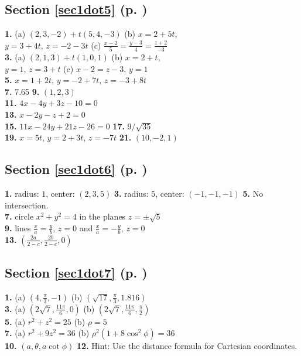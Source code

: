 \begin{multicols}{2}
\subsection*{Section \ref{sec1dot5} (p. \pageref{sec1dot5})}
\textbf{1.} (a) $(2,3,-2) + t(5,4,-3)$ \quad (b) $x = 2 + 5t,$\\$y = 3 + 4t, \, z = -2 - 3t$ \quad (c) $\frac{x - 2}{5} =
\frac{y - 3}{4} = \frac{z + 2}{-3}$\\\textbf{3.} (a) $(2,1,3) + t(1,0,1)$ \quad (b) $x = 2 + t,$\\$y = 1, \, z = 3 + t$
\quad (c) $x - 2 = z - 3, \, y = 1$\\\textbf{5.} $x = 1 + 2t, \, y = -2 + 7t, \, z = -3 + 8t$\\\textbf{7.} 7.65 \quad
\textbf{9.} $(1,2,3)$\\\textbf{11.} $4x - 4y + 3z - 10 = 0$\\\textbf{13.} $x - 2y - z + 2 = 0$\\\textbf{15.}
$11x - 24y + 21z - 26 = 0$ \quad \textbf{17.} $9/\sqrt{35}$\\\textbf{19.} $x = 5t$, $y = 2 + 3t$, $z = -7t$
\quad \textbf{21.} $(10,-2,1)$
\subsection*{Section \ref{sec1dot6} (p. \pageref{sec1dot6})}
\textbf{1.} radius: $1$, center: $(2,3,5)$ \quad \textbf{3.} radius: $5$, center: $(-1,-1,-1)$ \quad \textbf{5.} No
intersection.\\\textbf{7.} circle $x^2 + y^2 = 4$ in the planes $z = \pm \sqrt{5}$\\\textbf{9.} lines
$\frac{x}{a} = \frac{y}{b}$, $z = 0$ and $\frac{x}{a} = -\frac{y}{b}$, $z = 0$\\\textbf{13.}
$\left( \frac{2a}{2 - c}, \frac{2b}{2 - c}, 0 \right)$
\subsection*{Section \ref{sec1dot7} (p. \pageref{sec1dot7})}
\textbf{1.} (a) $(4,\frac{\pi}{3},-1)$ \quad (b) $(\sqrt{17},\frac{\pi}{3},1.816)$\\\textbf{3.} (a)
$(2\sqrt{7},\frac{11\pi}{6},0)$ \quad (b) $(2\sqrt{7},\frac{11\pi}{6},\frac{\pi}{2})$\\\textbf{5.} (a) $r^2 + z^2 = 25$
\quad (b) $\rho = 5$\\\textbf{7.} (a) $r^2 + 9z^2 = 36$ \quad (b) $\rho^2 ( 1 + 8 \cos^2 \phi ) = 36$\\
\textbf{10.} $(a,\theta,a \cot \phi )$ \quad \textbf{12.} Hint: Use the distance formula for Cartesian coordinates.

\end{multicols}
